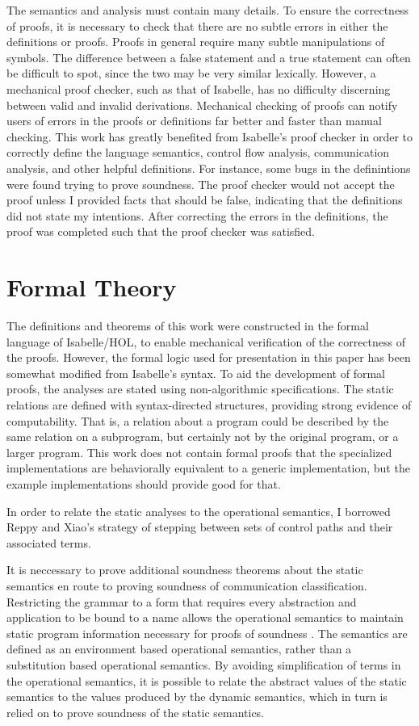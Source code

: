 \documentclass{article}
\begin{document}
The semantics and analysis must contain many details. To ensure the
correctness of proofs, it is necessary to check that there are no subtle errors in either the 
definitions or proofs. Proofs in general require many subtle manipulations of symbols. The
difference between a false statement and a true statement can often be difficult to spot, since
the two may be very similar lexically. However, a mechanical proof checker, such as that of 
Isabelle, has no difficulty discerning between valid and invalid derivations.
Mechanical checking of proofs can notify users of errors in the proofs or definitions far better
and faster than manual checking. This work has greatly benefited from Isabelle's proof checker in
order to correctly define the language semantics, control flow analysis, communication analysis,
and other helpful definitions. For instance, some bugs in the
definintions were found trying to prove
soundness. The proof checker would not accept the proof unless I provided facts that
should be false, indicating that the definitions did not state my intentions.
After correcting the errors in the definitions, the proof was completed such that the proof
checker was satisfied.

\section{Formal Theory}

The definitions and theorems of this work were constructed in the formal language of Isabelle/HOL,
to enable mechanical verification of the correctness of the proofs. However, the formal logic used
for presentation in this paper has been somewhat modified from Isabelle's syntax. 
To aid the development of formal proofs,
the analyses are stated using non-algorithmic specifications.
The static relations are defined
with syntax-directed structures, providing strong evidence of computability.
That is, a relation about a program could be described by the same relation on a subprogram,
but certainly not by the original program, or a larger program.
This work does not contain formal proofs that  the specialized implementations are
behaviorally equivalent to a generic implementation, but the example implementations
should provide good for that.

In order to relate the static analyses to the operational semantics, I
borrowed Reppy and Xiao's strategy of stepping between sets of control paths and
their associated terms.

It is neccessary to prove additional soundness theorems about the static semantics en route to
proving soundness of communication classification. Restricting the grammar to a form that requires
every abstraction and application to be bound to a name allows the operational
semantics to maintain static program information necessary for proofs of soundness \cite{}.
The semantics are defined as an environment based operational semantics, rather than a
substitution based operational semantics. By avoiding simplification of terms in the
operational semantics, it is possible to relate the abstract values of the static semantics to the
values produced by the dynamic semantics, which in turn is relied on to prove 
soundness of the static semantics.
\end{document}
